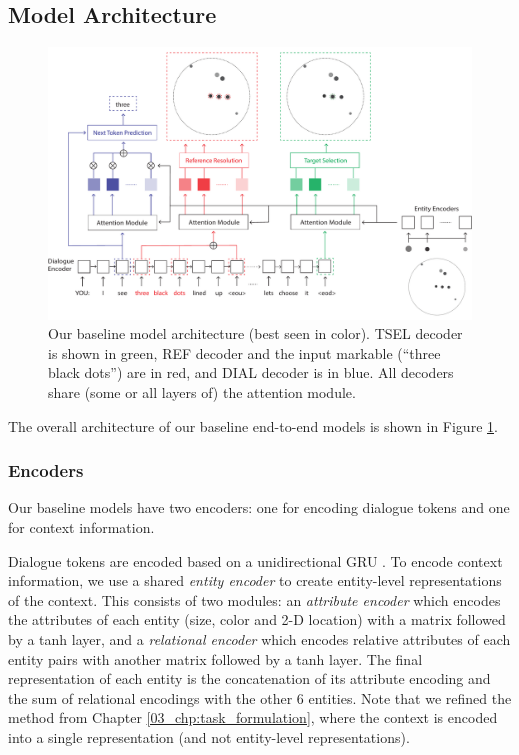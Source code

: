 

\subsection{Model Architecture}
\label{04_subsec:model_architecture}

\begin{figure}[th]
\centering
\includegraphics[width=\textwidth]{model_architecture.pdf}
\caption{Our baseline model architecture (best seen in color). TSEL decoder is shown in green, REF decoder and the input markable (``three black dots'') are in red, and DIAL decoder is in blue. All decoders share (some or all layers of) the attention module.}
\label{fig:model_architecture}
\end{figure}

The overall architecture of our baseline end-to-end models is shown in Figure \ref{fig:model_architecture}.

\subsubsection{Encoders}

Our baseline models have two encoders: one for encoding dialogue tokens and one for context information.

Dialogue tokens are encoded based on a unidirectional GRU \citep{cho2014properties}. To encode context information, we use a shared \textit{entity encoder} to create entity-level representations of the context. This consists of two modules: an \textit{attribute encoder} which encodes the attributes of each entity (size, color and 2-D location) with a matrix followed by a tanh layer, and a \textit{relational encoder} which encodes relative attributes of each entity pairs with another matrix followed by a tanh layer. The final representation of each entity is the concatenation of its attribute encoding and the sum of relational encodings with the other 6 entities. Note that we refined the method from Chapter \ref{03_chp:task_formulation}, where the context is encoded into a single representation (and not entity-level representations).

